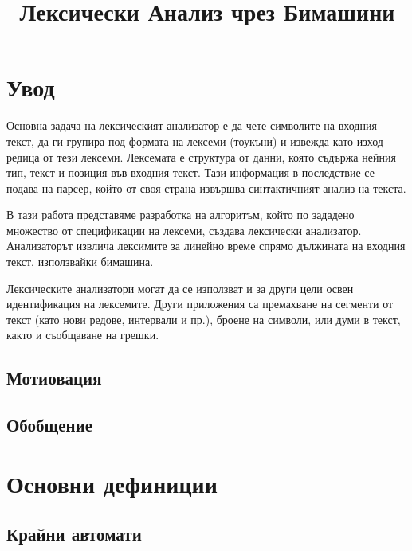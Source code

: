 \documentclass[12pt, oneside]{article}
\title{Лексически Анализ чрез Бимашини}
\theoremstyle{definition}
\begin{document}
\tableofcontents
\pagebreak

\section{Увод}

Основна задача на лексическият анализатор е да чете символите на входния текст, да ги групира под формата на лексеми (тоукъни) и извежда като изход редица от тези лексеми. Лексемата е структура от данни, която съдържа нейния тип, текст и позиция във входния текст. Тази информация в последствие се подава на парсер, който от своя страна извършва синтактичният анализ на текста.

В тази работа представяме разработка на алгоритъм, който по зададено множество от спецификации на лексеми, създава лексически анализатор. Анализаторът извлича лексимите за линейно време спрямо дължината на входния текст, използвайки бимашина.

Лексическите анализатори могат да се използват и за други цели освен идентификация на лексемите. Други приложения са премахване на сегменти от текст (като нови редове, интервали и пр.), броене на символи, или думи в текст, както и съобщаване на грешки.

\subsection{Мотиовация}

\subsection{Обобщение}

\pagebreak

\section{Основни дефиниции}

\subsection{Крайни автомати}
\end{document}
